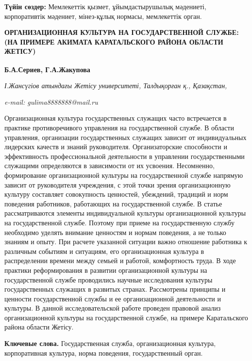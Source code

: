 {\bfseries Түйін сөздер:} Мемлекеттік қызмет, ұйымдастырушылық мәдениеті,
корпоративтік мәдениет, мінез-құлық нормасы, мемлекеттік орган.

\begin{articleheader}
{\bfseries ОРГАНИЗАЦИОННАЯ КУЛЬТУРА НА ГОСУДАРСТВЕННОЙ СЛУЖБЕ: (НА ПРИМЕРЕ АКИМАТА КАРАТАЛЬСКОГО РАЙОНА ОБЛАСТИ ЖЕТІСУ)}

{\bfseries
Б.А.Сериев,
Г.А.Жакупова\textsuperscript{\envelope }}
\end{articleheader}

\begin{affiliation}
\emph{І.Жансүгіов атындағы Жетісу университеті, Талдықорған қ., Қазақстан,}

\emph{e-mail: gulima8888888@mail.ru}
\end{affiliation}

Организационная культура государственных служащих часто встречается в
практике противоречивого управления на государственной службе. В области
управления, организации государственных служащих зависит от
индивидуальных лидерских качеств и знаний руководителя. Организаторские
способности и эффективность профессиональной деятельности в управлении
государственными служащими определяются в зависимости от их усвоения.
Несомненно, формирование организационной культуры на государственной
службе напрямую зависит от руководителя учреждения, с этой точки зрения
организационную культуру составляет совокупность ценностей, убеждений,
традиций и норм поведения работников, работающих на государственной
службе. В статье рассматриваются элементы индивидуальной культуры
организационной культуры на государственной службе. Поэтому при приеме
на государственную службу необходимо уделять внимание ценностям и нормам
поведения, а не только знаниям и опыту. При расчете указанной ситуации
важно отношение работника к различным событиям и ситуациям, его
организационная культура в распределении времени между семьей и работой,
комфортность труда. В ходе практики реформирования в развитии
организационной культуры на государственной службе проводились научные
исследования культуры государственных служащих в развитых странах.
Рассмотрены принципы и ценности государственной службы и ее
организационной деятельности и культуры. В данной исследовательской
работе проведен правовой анализ организационной культуры на
государственной службе, на примере Каратальского района области Жетісу.

{\bfseries Ключевые слова.} Государственная служба, организационная
культура, корпоративная культура, норма поведения, государственный
орган.

